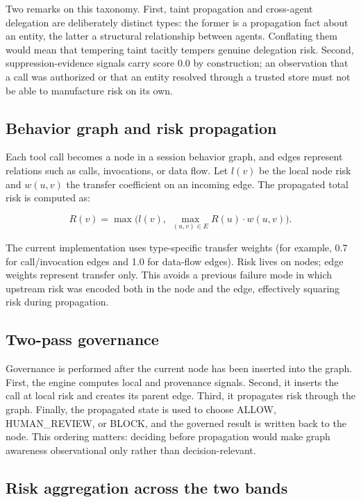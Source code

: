 \documentclass[letterpaper,twocolumn,10pt]{article}
\begin{document}
Two remarks on this taxonomy. First, taint propagation and cross-agent
delegation are deliberately distinct types: the former is a propagation fact
about an entity, the latter a structural relationship between agents.
Conflating them would mean that tempering taint tacitly tempers genuine
delegation risk. Second, suppression-evidence signals carry score 0.0 by
construction; an observation that a call was authorized or that an entity
resolved through a trusted store must not be able to manufacture risk on its
own.

\subsection{Behavior graph and risk propagation}
\label{sec:graph}

Each tool call becomes a node in a session behavior graph, and edges represent
relations such as calls, invocations, or data flow. Let $l(v)$ be the local
node risk and $w(u,v)$ the transfer coefficient on an incoming edge. The
propagated total risk is computed as:

\begin{equation}
R(v) = \max\Big( l(v),\; \max_{(u,v)\in E} R(u)\cdot w(u,v) \Big).
\label{eq:propagation}
\end{equation}

The current implementation uses type-specific transfer weights (for example,
0.7 for call/invocation edges and 1.0 for data-flow edges). Risk lives on
nodes; edge weights represent transfer only. This avoids a previous failure
mode in which upstream risk was encoded both in the node and the edge,
effectively squaring risk during propagation.

\subsection{Two-pass governance}
\label{sec:twopass}

Governance is performed after the current node has been inserted into the
graph. First, the engine computes local and provenance signals. Second, it
inserts the call at local risk and creates its parent edge. Third, it
propagates risk through the graph. Finally, the propagated state is used to
choose ALLOW, HUMAN\_REVIEW, or BLOCK, and the governed result is written back
to the node. This ordering matters: deciding before propagation would make
graph awareness observational only rather than decision-relevant.

\subsection{Risk aggregation across the two bands}
\label{sec:aggregation}
\end{document}
